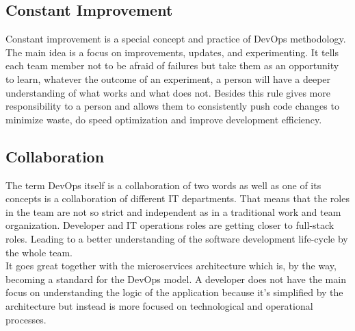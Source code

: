 \subsection{Constant Improvement} Constant improvement is a special concept and practice of DevOps methodology. The main idea is a focus on improvements, updates, and experimenting. It tells each team member not to be afraid of failures but take them as an opportunity to learn, whatever the outcome of an experiment, a person will have a deeper understanding of what works and what does not. Besides this rule gives more responsibility to a person and allows them to consistently push code changes to minimize waste, do speed optimization and improve development efficiency.

\subsection{Collaboration} The term DevOps itself is a collaboration of two words as well as one of its concepts is a collaboration of different IT departments. That means that the roles in the team are not so strict and independent as in a traditional work and team organization. Developer and IT operations roles are getting closer to full-stack roles. Leading to a better understanding of the software development life-cycle by the whole team.\\
It goes great together with the microservices architecture which is, by the way, becoming a standard for the DevOps model. A developer does not have the main focus on understanding the logic of the application because it's simplified by the architecture but instead is more focused on technological and operational processes.








